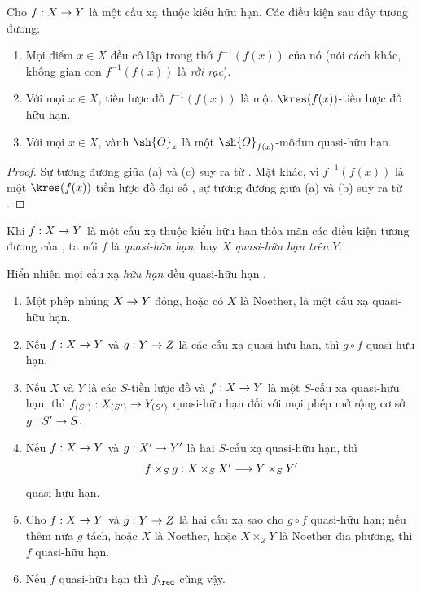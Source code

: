 \documentclass[oneside,10pt]{amsart}
\makeatletter
\newcommand{\ega@arrow}[2]{\mathchoice{#1}{#2}{#2}{#2}}
\renewcommand{\to}{\ega@arrow{\longrightarrow}{\rightarrow}}
\let\EGAOriginalLabel\label
\renewcommand{\label}[1]{\phantomsection\EGAOriginalLabel{#1}}
\makeatother
\begin{document}
\begin{corollary}[6.2.2]
\label{II.6.2.2}
Cho $f:X\to Y$ là một cấu xạ thuộc kiểu hữu hạn.
Các điều kiện sau đây tương đương:
\begin{enumerate}
  \item[\rm{(a)}] Mọi điểm $x\in X$ đều cô lập trong thớ $f^{-1}(f(x))$ của nó (nói cách khác, không gian con $f^{-1}(f(x))$ là \emph{rời rạc}).
  \item[\rm{(b)}] Với mọi $x\in X$, tiền lược đồ $f^{-1}(f(x))$ là một $\kres(f(x))$-tiền lược đồ hữu hạn.
  \item[\rm{(c)}] Với mọi $x\in X$, vành $\sh{O}_x$ là một $\sh{O}_{f(x)}$-môđun quasi-hữu hạn.
\end{enumerate}
\end{corollary}

\begin{proof}
Sự tương đương giữa (a) và (c) suy ra từ .
Mặt khác, vì $f^{-1}(f(x))$ là một $\kres(f(x))$-tiền lược đồ đại số , sự tương đương giữa (a) và (b) suy ra từ .
\end{proof}

\begin{definition}[6.2.3]
\label{II.6.2.3}
Khi $f:X\to Y$ là một cấu xạ thuộc kiểu hữu hạn thỏa mãn các điều kiện tương đương của , ta nói $f$ là \emph{quasi-hữu hạn}, hay $X$ \emph{quasi-hữu hạn trên $Y$}.
\end{definition}

Hiển nhiên mọi cấu xạ \emph{hữu hạn} đều quasi-hữu hạn .

\begin{proposition}[6.2.4]
\label{II.6.2.4}
\medskip\noindent
\begin{enumerate}
  \item[\rm{(i)}] Một phép nhúng $X\to Y$ đóng, hoặc có $X$ là Noether, là một cấu xạ quasi-hữu hạn.
  \item[\rm{(ii)}] Nếu $f:X\to Y$ và $g:Y\to Z$ là các cấu xạ quasi-hữu hạn, thì $g\circ f$ quasi-hữu hạn.
  \item[\rm{(iii)}] Nếu $X$ và $Y$ là các $S$-tiền lược đồ và $f:X\to Y$ là một $S$-cấu xạ quasi-hữu hạn, thì $f_{(S')}:X_{(S')}\to Y_{(S')}$ quasi-hữu hạn đối với mọi phép mở rộng cơ sở $g:S'\to S$.
  \item[\rm{(iv)}] Nếu $f:X\to Y$ và $g:X'\to Y'$ là hai $S$-cấu xạ quasi-hữu hạn, thì
    \[
      f\times_S g:X\times_S X'\to Y\times_S Y'
    \]
    quasi-hữu hạn.
  \item[\rm{(v)}] Cho $f:X\to Y$ và $g:Y\to Z$ là hai cấu xạ sao cho $g\circ f$ quasi-hữu hạn; nếu thêm nữa $g$ tách, hoặc $X$ là Noether, hoặc $X\times_ZY$ là Noether địa phương, thì $f$ quasi-hữu hạn.
  \item[\rm{(vi)}] Nếu $f$ quasi-hữu hạn thì $f_\red$ cũng vậy.
\end{enumerate}
\end{proposition}
\end{document}

